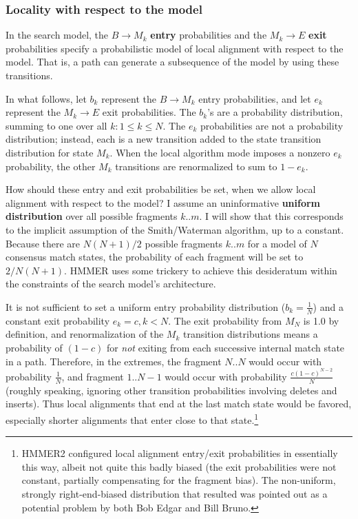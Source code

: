 \documentclass[11pt]{article}
\begin{document}
\subsubsection{Locality with respect to the model}

In the search model, the $B \rightarrow M_k$ \textbf{entry}
probabilities and the $M_k \rightarrow E$ \textbf{exit} probabilities
specify a probabilistic model of local alignment with respect to the
model. That is, a path can generate a subsequence of the model by
using these transitions. 

In what follows, let $b_k$ represent the $B \rightarrow M_k$ entry
probabilities, and let $e_k$ represent the $M_k \rightarrow E$ exit
probabilities. The $b_k$'s are a probability distribution, summing to
one over all $k : 1 \leq k \leq N$. The $e_k$ probabilities are not a
probability distribution; instead, each is a new transition added to
the state transition distribution for state $M_k$. When the local
algorithm mode imposes a nonzero $e_k$ probability, the other $M_k$
transitions are renormalized to sum to $1-e_k$.

How should these entry and exit probabilities be set, when we allow
local alignment with respect to the model? I assume an uninformative
\textbf{uniform distribution} over all possible fragments $k..m$. I
will show that this corresponds to the implicit assumption of the
Smith/Waterman algorithm, up to a constant. Because there are
$N(N+1)/2$ possible fragments $k..m$ for a model of $N$ consensus
match states, the probability of each fragment will be set to
$2/N(N+1)$. HMMER uses some trickery to achieve this desideratum
within the constraints of the search model's architecture.

It is not sufficient to set a uniform entry probability distribution
($b_k = \frac{1}{N}$) and a constant exit probability $e_k = c, k <
N$. The exit probability from $M_N$ is 1.0 by definition, and
renormalization of the $M_k$ transition distributions means a
probability of $(1-c)$ for \emph{not} exiting from each successive
internal match state in a path. Therefore, in the extremes, the
fragment $N..N$ would occur with probability $\frac{1}{N}$, and
fragment $1..N-1$ would occur with probability $\frac{c
(1-c)^{N-2}}{N}$ (roughly speaking, ignoring other transition
probabilities involving deletes and inserts). Thus local alignments
that end at the last match state would be favored, especially shorter
alignments that enter close to that state.\footnote{HMMER2 configured
local alignment entry/exit probabilities in essentially this way,
albeit not quite this badly biased (the exit probabilities were not
constant, partially compensating for the fragment bias). The
non-uniform, strongly right-end-biased distribution that resulted was
pointed out as a potential problem by both Bob Edgar and Bill Bruno.}
\end{document}
